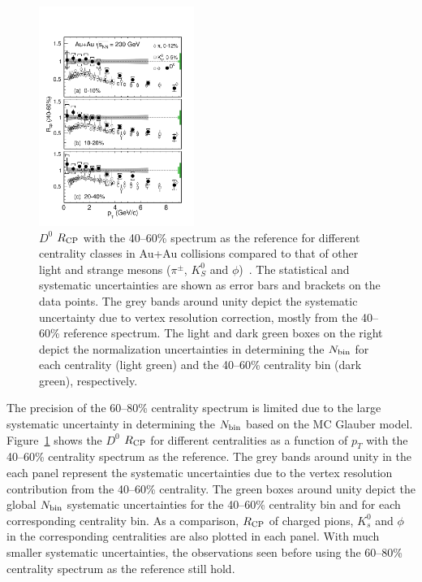 \documentclass[%
 reprint,	
 amsmath,amssymb,
 aps,
 prc,
]{revtex4-1}
\begin{document}
\begin{figure}
\centering
\includegraphics[width=0.45\textwidth]{fig/D0_Rcp2.pdf}
\caption{$D^{0}$ $R_{\rm CP}$ with the 40--60\% spectrum as the reference for different centrality classes in Au+Au collisions compared to that of other light and strange mesons ($\pi^{\pm}$, $K^0_{S}$ and $\phi$)~\cite{Adams2006_Identified,Abelev2009,Agakishiev2012}. The statistical and systematic uncertainties are shown as error bars and brackets on the data points. The grey bands around unity depict the systematic uncertainty due to vertex resolution correction, mostly from the 40--60\% reference spectrum. The light and dark green boxes on the right depict the normalization uncertainties in determining the $N_{\rm bin}$ for each centrality (light green) and the 40--60\% centrality bin (dark green), respectively.}
\label{fig:D0_Rcp2} 
\end{figure}

The precision of the 60--80\% centrality spectrum is limited due to the large systematic uncertainty in determining the $N_{\rm bin}$ based on the MC Glauber model. Figure~\ref{fig:D0_Rcp2} shows the $D^0$ $R_{\rm CP}$ for different centralities as a function of $p_{T}$ with the 40--60\% centrality spectrum as the reference. The grey bands around unity in the each panel represent the systematic uncertainties due to the vertex resolution contribution from the 40--60\% centrality. The green boxes around unity depict the global $N_{\rm bin}$ systematic uncertainties for the 40--60\% centrality bin and for each corresponding centrality bin. As a comparison, $R_{\rm CP}$ of charged pions, $K_{s}^{0}$ and $\phi$ in the corresponding centralities are also plotted in each panel. With much smaller systematic uncertainties, the observations seen before using the 60--80\% centrality spectrum as the reference still hold. 
\end{document}
